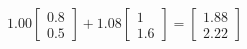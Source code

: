 \documentclass[preview]{standalone}
\begin{document}
\begin{align*}
1.00 \begin{bmatrix} 0.8 \\ 0.5 \end{bmatrix} + 1.08 \begin{bmatrix} 1 \\ 1.6 \end{bmatrix} = \begin{bmatrix} 1.88 \\ 2.22 \end{bmatrix}
\end{align*}
\end{document}
